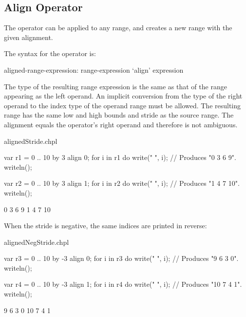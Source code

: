 \subsection{Align Operator}
\label{Align_Operator_For_Ranges}

The  operator can be applied to any range, and creates a new range
with the given alignment.  

The syntax for the  operator is:
\begin{syntax}
aligned-range-expression:
  range-expression `align' expression
\end{syntax}
\noindent The type of the resulting range expression is the same as that of the
range appearing as the left operand.  An implicit conversion from
the type of the right operand to the index type of the operand range
must be allowed.
The resulting range has the
same low and high bounds and stride as the source range. The
alignment equals the  operator's right operand
and therefore is not ambiguous. 

\begin{chapelexample}{alignedStride.chpl}
\begin{chapel}
var r1 = 0 .. 10 by 3 align 0;
for i in r1 do
  write(" ", i);			// Produces "0 3 6 9".
writeln();

var r2 = 0 .. 10 by 3 align 1;
for i in r2 do
  write(" ", i);			// Produces "1 4 7 10".
writeln();
\end{chapel}
\begin{chapeloutput}
 0 3 6 9
 1 4 7 10
\end{chapeloutput}
\end{chapelexample}

When the stride is negative, the same indices are printed in reverse:
\begin{chapelexample}{alignedNegStride.chpl}
\begin{chapel}
var r3 = 0 .. 10 by -3 align 0;
for i in r3 do
  write(" ", i);			// Produces "9 6 3 0".
writeln();

var r4 = 0 .. 10 by -3 align 1;
for i in r4 do
  write(" ", i);			// Produces "10 7 4 1".
writeln();
\end{chapel}
\begin{chapeloutput}
 9 6 3 0
 10 7 4 1
\end{chapeloutput}
\end{chapelexample}

